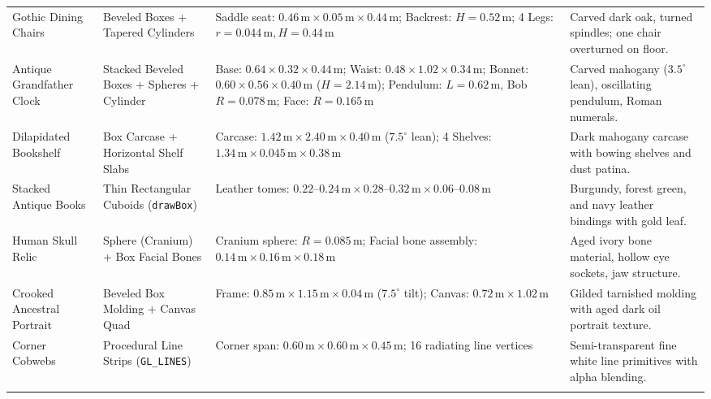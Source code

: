 \documentclass[10pt,a4paper,oneside]{article}
\begin{document}
\begin{longtable}{>{\raggedright\arraybackslash}p{}>{\raggedright\arraybackslash}p{}>{\raggedright\arraybackslash}p{}>{\raggedright\arraybackslash}p{}}
Gothic Dining Chairs & Beveled Boxes + Tapered Cylinders & Saddle seat: $0.46\,\mathrm{m} \times 0.05\,\mathrm{m} \times 0.44\,\mathrm{m}$; Backrest: $H=0.52\,\mathrm{m}$; 4 Legs: $r=0.044\,\mathrm{m}, H=0.44\,\mathrm{m}$ & Carved dark oak, turned spindles; one chair overturned on floor.\\\addlinespace[3pt]

Antique Grandfather Clock & Stacked Beveled Boxes + Spheres + Cylinder & Base: $0.64\times 0.32\times 0.44\,\mathrm{m}$; Waist: $0.48\times 1.02\times 0.34\,\mathrm{m}$; Bonnet: $0.60\times 0.56\times 0.40\,\mathrm{m}$ ($H=2.14\,\mathrm{m}$); Pendulum: $L=0.62\,\mathrm{m}$, Bob $R=0.078\,\mathrm{m}$; Face: $R=0.165\,\mathrm{m}$ & Carved mahogany ($3.5^\circ$ lean), oscillating pendulum, Roman numerals.\\\addlinespace[3pt]

Dilapidated Bookshelf & Box Carcase + Horizontal Shelf Slabs & Carcase: $1.42\,\mathrm{m} \times 2.40\,\mathrm{m} \times 0.40\,\mathrm{m}$ ($7.5^\circ$ lean); 4 Shelves: $1.34\,\mathrm{m} \times 0.045\,\mathrm{m} \times 0.38\,\mathrm{m}$ & Dark mahogany carcase with bowing shelves and dust patina.\\\addlinespace[3pt]

Stacked Antique Books & Thin Rectangular Cuboids (\texttt{drawBox}) & Leather tomes: $0.22\text{--}0.24\,\mathrm{m} \times 0.28\text{--}0.32\,\mathrm{m} \times 0.06\text{--}0.08\,\mathrm{m}$ & Burgundy, forest green, and navy leather bindings with gold leaf.\\\addlinespace[3pt]

Human Skull Relic & Sphere (Cranium) + Box Facial Bones & Cranium sphere: $R=0.085\,\mathrm{m}$; Facial bone assembly: $0.14\,\mathrm{m} \times 0.16\,\mathrm{m} \times 0.18\,\mathrm{m}$ & Aged ivory bone material, hollow eye sockets, jaw structure.\\\addlinespace[3pt]

Crooked Ancestral Portrait & Beveled Box Molding + Canvas Quad & Frame: $0.85\,\mathrm{m} \times 1.15\,\mathrm{m} \times 0.04\,\mathrm{m}$ ($7.5^\circ$ tilt); Canvas: $0.72\,\mathrm{m} \times 1.02\,\mathrm{m}$ & Gilded tarnished molding with aged dark oil portrait texture.\\\addlinespace[3pt]

Corner Cobwebs & Procedural Line Strips (\texttt{GL\_LINES}) & Corner span: $0.60\,\mathrm{m} \times 0.60\,\mathrm{m} \times 0.45\,\mathrm{m}$; 16 radiating line vertices & Semi-transparent fine white line primitives with alpha blending.\\\addlinespace[3pt]

\bottomrule\end{longtable}
\end{document}
